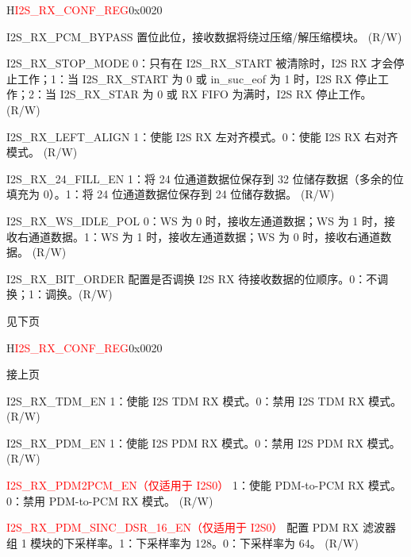 \begin{register}{H}{\textcolor{red}{I2S\_RX\_CONF\_REG}}{0x{}0020}
\begin{regdesc}
\begin{reglist}
\label{fielddesc:I2SRXPCMBYPASS}\item [I2S\_RX\_PCM\_BYPASS] 置位此位，接收数据将绕过压缩/解压缩模块。 (R/W)
\label{fielddesc:I2SRXSTOPMODE}\item [I2S\_RX\_STOP\_MODE] 0：只有在 I2S\_RX\_START 被清除时，I2S RX 才会停止工作；1：当 I2S\_RX\_START 为 0 或 in\_suc\_eof 为 1 时，I2S RX 停止工作；2：当 I2S\_RX\_STAR 为 0 或 RX FIFO 为满时，I2S RX 停止工作。 (R/W)
\label{fielddesc:I2SRXLEFTALIGN}\item [I2S\_RX\_LEFT\_ALIGN] 1：使能 I2S RX 左对齐模式。0：使能 I2S RX 右对齐模式。 (R/W)
\label{fielddesc:I2SRX24FILLEN}\item [I2S\_RX\_24\_FILL\_EN] 1：将 24 位通道数据位保存到 32 位储存数据（多余的位填充为 0）。1：将 24 位通道数据位保存到 24 位储存数据。 (R/W)
\label{fielddesc:I2SRXWSIDLEPOL}\item [I2S\_RX\_WS\_IDLE\_POL] 0：WS 为 0 时，接收左通道数据；WS 为 1 时，接收右通道数据。1：WS 为 1 时，接收左通道数据；WS 为 0 时，接收右通道数据。 (R/W)
\label{fielddesc:I2SRXBITORDER}\item [I2S\_RX\_BIT\_ORDER] 配置是否调换 I2S RX 待接收数据的位顺序。0：不调换；1：调换。(R/W)
\item [见下页]
\end{reglist}\end{regdesc}
\end{register}

\addtocounter{Regfloat}{-1}
\begin{register}{H}{\textcolor{red}{I2S\_RX\_CONF\_REG}}{0x{}0020}
\begin{regdesc}\begin{reglist}
\item [接上页]
\label{fielddesc:I2SRXTDMEN}\item [I2S\_RX\_TDM\_EN] 1：使能 I2S TDM RX 模式。0：禁用 I2S TDM RX 模式。 (R/W)
\label{fielddesc:I2SRXPDMEN}\item [I2S\_RX\_PDM\_EN] 1：使能 I2S PDM RX 模式。0：禁用 I2S PDM RX 模式。 (R/W)
\label{fielddesc:I2SRXPDM2PCMEN}\item [\textcolor{red}{I2S\_RX\_PDM2PCM\_EN（仅适用于 I2S0）}] 1：使能 PDM-to-PCM RX 模式。0：禁用 PDM-to-PCM RX 模式。 (R/W)
\label{fielddesc:I2SRXPDMSINCDSR16EN}\item [\textcolor{red}{I2S\_RX\_PDM\_SINC\_DSR\_16\_EN（仅适用于 I2S0）}] 配置 PDM RX 滤波器组 1 模块的下采样率。1：下采样率为 128。0：下采样率为 64。 (R/W)
\end{reglist}\end{regdesc}
\end{register}


